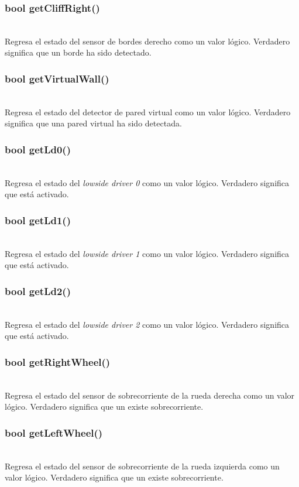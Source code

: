 \documentclass[letterpaper]{book}
\begin{document}
\subsubsection{bool getCliffRight()}\mbox{}\\
Regresa el estado del sensor de bordes derecho como un valor lógico. Verdadero significa que un borde ha sido detectado.\\
\subsubsection{bool getVirtualWall()}\mbox{}\\
Regresa el estado del detector de pared virtual como un valor lógico. Verdadero significa que una pared virtual ha sido detectada.\\
\subsubsection{bool getLd0()}\mbox{}\\
Regresa el estado del \emph{lowside driver 0} como un valor lógico. Verdadero significa que está activado.\\
\subsubsection{bool getLd1()}\mbox{}\\
Regresa el estado del \emph{lowside driver 1} como un valor lógico. Verdadero significa que está activado.\\
\subsubsection{bool getLd2()}\mbox{}\\
Regresa el estado del \emph{lowside driver 2} como un valor lógico. Verdadero significa que está activado.\\

\subsubsection{bool getRightWheel()}\mbox{}\\
Regresa el estado del sensor de sobrecorriente de la rueda derecha como un valor lógico. Verdadero significa que un existe sobrecorriente.\\
\subsubsection{	bool getLeftWheel()}\mbox{}\\
Regresa el estado del sensor de sobrecorriente de la rueda izquierda como un valor lógico. Verdadero significa que un existe sobrecorriente.\\
\end{document}
